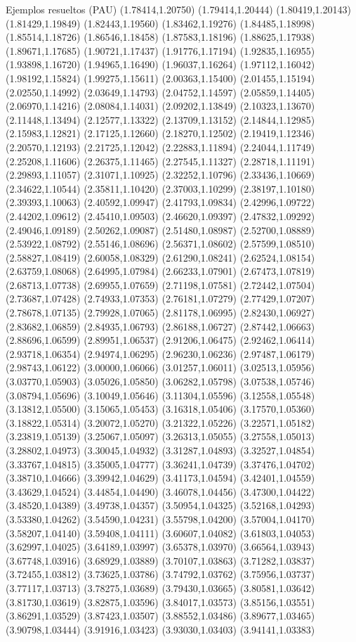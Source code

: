 \documentclass[11pt,a4paper]{article}
\begin{document}
\begin{fmex}{Ejemplos resueltos (PAU)}
(1.78414,1.20750) (1.79414,1.20444) (1.80419,1.20143) (1.81429,1.19849) (1.82443,1.19560) (1.83462,1.19276) (1.84485,1.18998) (1.85514,1.18726) (1.86546,1.18458) (1.87583,1.18196) (1.88625,1.17938) (1.89671,1.17685) (1.90721,1.17437) (1.91776,1.17194) (1.92835,1.16955) (1.93898,1.16720) (1.94965,1.16490) (1.96037,1.16264) (1.97112,1.16042) (1.98192,1.15824) (1.99275,1.15611) (2.00363,1.15400) (2.01455,1.15194) (2.02550,1.14992) (2.03649,1.14793) (2.04752,1.14597) (2.05859,1.14405) (2.06970,1.14216) (2.08084,1.14031) (2.09202,1.13849) (2.10323,1.13670) (2.11448,1.13494) (2.12577,1.13322) (2.13709,1.13152) (2.14844,1.12985) (2.15983,1.12821) (2.17125,1.12660) (2.18270,1.12502) (2.19419,1.12346) (2.20570,1.12193) (2.21725,1.12042) (2.22883,1.11894) (2.24044,1.11749) (2.25208,1.11606) (2.26375,1.11465) (2.27545,1.11327) (2.28718,1.11191) (2.29893,1.11057) (2.31071,1.10925) (2.32252,1.10796) (2.33436,1.10669) (2.34622,1.10544) (2.35811,1.10420) (2.37003,1.10299) (2.38197,1.10180) (2.39393,1.10063) (2.40592,1.09947) (2.41793,1.09834) (2.42996,1.09722) (2.44202,1.09612) (2.45410,1.09503) (2.46620,1.09397) (2.47832,1.09292) (2.49046,1.09189) (2.50262,1.09087) (2.51480,1.08987) (2.52700,1.08889) (2.53922,1.08792) (2.55146,1.08696) (2.56371,1.08602) (2.57599,1.08510) (2.58827,1.08419) (2.60058,1.08329) (2.61290,1.08241) (2.62524,1.08154) (2.63759,1.08068) (2.64995,1.07984) (2.66233,1.07901) (2.67473,1.07819) (2.68713,1.07738) (2.69955,1.07659) (2.71198,1.07581) (2.72442,1.07504) (2.73687,1.07428) (2.74933,1.07353) (2.76181,1.07279) (2.77429,1.07207) (2.78678,1.07135) (2.79928,1.07065) (2.81178,1.06995) (2.82430,1.06927) (2.83682,1.06859) (2.84935,1.06793) (2.86188,1.06727) (2.87442,1.06663) (2.88696,1.06599) (2.89951,1.06537) (2.91206,1.06475) (2.92462,1.06414) (2.93718,1.06354) (2.94974,1.06295) (2.96230,1.06236) (2.97487,1.06179) (2.98743,1.06122) (3.00000,1.06066) (3.01257,1.06011) (3.02513,1.05956) (3.03770,1.05903) (3.05026,1.05850) (3.06282,1.05798) (3.07538,1.05746) (3.08794,1.05696) (3.10049,1.05646) (3.11304,1.05596) (3.12558,1.05548) (3.13812,1.05500) (3.15065,1.05453) (3.16318,1.05406) (3.17570,1.05360) (3.18822,1.05314) (3.20072,1.05270) (3.21322,1.05226) (3.22571,1.05182) (3.23819,1.05139) (3.25067,1.05097) (3.26313,1.05055) (3.27558,1.05013) (3.28802,1.04973) (3.30045,1.04932) (3.31287,1.04893) (3.32527,1.04854) (3.33767,1.04815) (3.35005,1.04777) (3.36241,1.04739) (3.37476,1.04702) (3.38710,1.04666) (3.39942,1.04629) (3.41173,1.04594) (3.42401,1.04559) (3.43629,1.04524) (3.44854,1.04490) (3.46078,1.04456) (3.47300,1.04422) (3.48520,1.04389) (3.49738,1.04357) (3.50954,1.04325) (3.52168,1.04293) (3.53380,1.04262) (3.54590,1.04231) (3.55798,1.04200) (3.57004,1.04170) (3.58207,1.04140) (3.59408,1.04111) (3.60607,1.04082) (3.61803,1.04053) (3.62997,1.04025) (3.64189,1.03997) (3.65378,1.03970) (3.66564,1.03943) (3.67748,1.03916) (3.68929,1.03889) (3.70107,1.03863) (3.71282,1.03837) (3.72455,1.03812) (3.73625,1.03786) (3.74792,1.03762) (3.75956,1.03737) (3.77117,1.03713) (3.78275,1.03689) (3.79430,1.03665) (3.80581,1.03642) (3.81730,1.03619) (3.82875,1.03596) (3.84017,1.03573) (3.85156,1.03551) (3.86291,1.03529) (3.87423,1.03507) (3.88552,1.03486) (3.89677,1.03465) (3.90798,1.03444) (3.91916,1.03423) (3.93030,1.03403) (3.94141,1.03383) 
\end{fmex}
\end{document}
